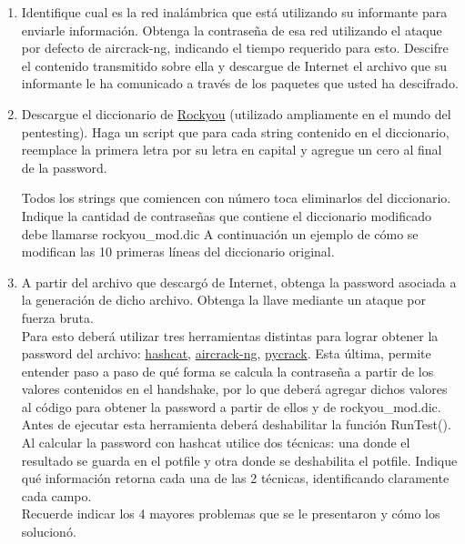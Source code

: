 \documentclass[letter,12pt]{article}
\begin{document}
\begin{enumerate}
    \item Identifique cual es la red inalámbrica que está utilizando su informante para enviarle información. Obtenga la contraseña de esa red utilizando el ataque por defecto de aircrack-ng, indicando el tiempo requerido para esto. Descifre el contenido transmitido sobre ella y descargue de Internet el archivo que su informante le ha comunicado a través de los paquetes que usted ha descifrado.
    
    \item Descargue el diccionario de \href{https://github.com/brannondorsey/naive-hashcat/releases/download/data/rockyou.txt}{Rockyou} (utilizado ampliamente en el mundo del pentesting). Haga un script que para cada string contenido en el diccionario, reemplace la primera letra por su letra en capital y agregue un cero al final de la password.\par
    Todos los strings que comiencen con número toca eliminarlos del diccionario. Indique la cantidad de contraseñas que contiene el diccionario modificado debe llamarse rockyou\_mod.dic
    A continuación un ejemplo de cómo se modifican las 10 primeras líneas del diccionario original.
    
    \item A partir del archivo que descargó de Internet, obtenga la password asociada a la generación de dicho archivo. Obtenga la llave mediante un ataque por fuerza bruta.\\ 
    Para esto deberá utilizar tres herramientas distintas para lograr obtener la password del archivo: \href{https://github.com/hashcat/hashcat}{hashcat}, \href{https://github.com/aircrack-ng/aircrack-ng}{aircrack-ng}, \href{https://github.com/nogilnick/PyCrack}{pycrack}. Esta última, permite entender paso a paso de qué forma se calcula la contraseña a partir de los valores contenidos en el handshake, por lo que deberá agregar dichos valores al código para obtener la password a partir de ellos y de rockyou\_mod.dic. Antes de ejecutar esta herramienta deberá deshabilitar la función RunTest().\\
    Al calcular la password con hashcat utilice dos técnicas: una donde el resultado se guarda en el potfile y otra donde se deshabilita el potfile.
    Indique qué información retorna cada una de las 2 técnicas, identificando claramente cada campo.\\
    Recuerde indicar los 4 mayores problemas que se le presentaron y cómo los solucionó.\\

\end{enumerate}
\end{document}
